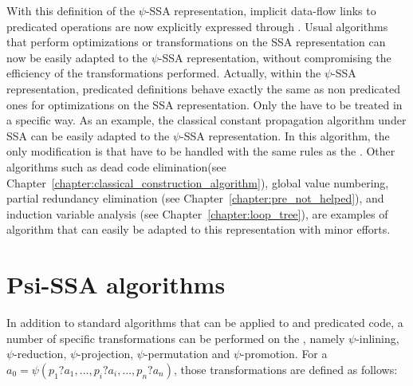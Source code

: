 With this definition of the $\psi$-SSA representation, implicit data-flow links to predicated operations are now explicitly expressed through \psifuns. Usual algorithms that perform
optimizations or transformations on the SSA representation can now be
easily adapted to the $\psi$-SSA representation, without compromising
the efficiency of the transformations performed. Actually, within the
$\psi$-SSA representation, predicated definitions behave exactly the
same as non predicated ones for optimizations on the SSA
representation. Only the \psifuns have to be treated in a
specific way. As an example, the classical constant propagation
algorithm under SSA can be easily adapted to the $\psi$-SSA
representation. In this algorithm, the only modification is that
\psifuns have to be handled with the same rules as the \phifuns. Other algorithms such as dead code elimination(see Chapter~\ref{chapter:classical_construction_algorithm}), global
value numbering, partial redundancy elimination (see Chapter~\ref{chapter:pre_not_helped}), and induction
variable analysis (see Chapter~\ref{chapter:loop_tree}), are examples of algorithm that can easily be adapted
to this representation with minor efforts.

\section{Psi-SSA algorithms}



In addition to standard algorithms that can be applied to \psifuns and predicated code, a number of specific transformations
can be performed on the \psifuns, namely $\psi$-inlining,
$\psi$-reduction, $\psi$-projection, $\psi$-permutation and
$\psi$-promotion. For a \psifun ${a_0 = \psi(p_1?a_1, ...,
  p_i?a_i, ..., p_n?a_n)}$, those transformations are defined as
follows:


